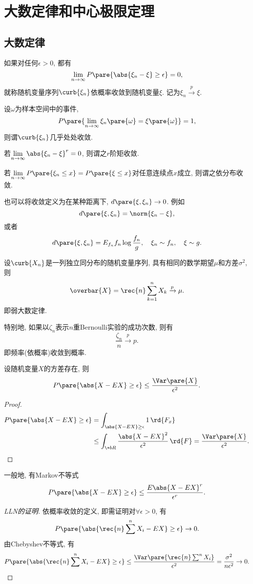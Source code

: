 \documentclass[../Statistics.tex]{subfiles}
\begin{document}
\section{大数定律和中心极限定理} %
\label{sec:大数定律和中心极限定理}

\subsection{大数定律} %
\label{sub:大数定律}

如果对任何$\epsilon>0$, 都有
\[ \lim_{n\rightarrow \infty} P\pare{\abs{\xi_n - \xi}\ge \epsilon} = 0, \]
就称随机变量序列$\curb{\xi_n}$依概率收敛到随机变量$\xi$. 记为$\xi_n\xrightarrow{p} \xi$.
\par
设$\omega$为样本空间中的事件,
\[ P\pare{\lim_{n\rightarrow\infty}\xi_n\pare{\omega} = \xi\pare{\omega}} = 1, \]
则谓$\curb{\xi_n}$几乎处处收敛.
\par
若$\displaystyle \lim_{n\rightarrow\infty} \abs{\xi_n - \xi}^r = 0$, 则谓之$r$阶矩收敛.
\par
若$\displaystyle \lim_{n\rightarrow\infty} P\pare{\xi_n \le x} = P\pare{\xi \le x}$对任意连续点$x$成立, 则谓之依分布收敛.
\par
也可以将收敛定义为在某种距离下, $d\pare{\xi, \xi_n}\rightarrow 0$. 例如
\[ d\pare{\xi, \xi_n} = \norm{\xi_n - \xi}, \]
或者
\[ d\pare{\xi, \xi_n} = E_{f_n}f_n\log \frac{f_n}{g}, \quad \xi_n \sim f_n,\quad \xi\sim g. \]
\begin{theorem}
    设$\curb{X_n}$是一列独立同分布的随机变量序列, 具有相同的数学期望$\mu$和方差$\sigma^2$, 则
    \[ \overbar{X} = \rec{n} \sum_{k=1}^n X_k \xrightarrow{p} \mu. \]
    即弱大数定律.
\end{theorem}
特别地, 如果以$\zeta_n$表示$n$重Bernoulli实验的成功次数, 则有
\[ \frac{\zeta_n}{n} \xrightarrow{p} p. \]
即频率(依概率)收敛到概率.
\begin{lemma}[Chebyshev不等式]
    设随机变量$X$的方差存在, 则
    \[ P\pare{\abs{X-EX} \ge \epsilon} \le \frac{\Var\pare{X}}{\epsilon^2}. \]
\end{lemma}
\begin{proof}
    \begin{align*}
        P\pare{\abs{X-EX}\ge \epsilon} &= \int_{\abs{X-EX}\ge\epsilon} 1\,\rd{F_x} \\
        & \le \int_{\+bR} \frac{\abs{X-EX}^2}{\epsilon^2}\,\rd{F} = \frac{\Var\pare{X}}{\epsilon^2}. \qedhere
    \end{align*}
\end{proof}
\begin{remark}
    一般地, 有Markov不等式
    \[ P\pare{\abs{X-EX}\ge \epsilon} \le \frac{E\abs{X-EX}^r}{\epsilon^r}. \]
\end{remark}
\begin{proof}[LLN的证明]
    依概率收敛的定义, 即需证明对$\forall \epsilon>0$, 有
    \[ P\pare{\abs{\rec{n} \sum^n X_i - EX}\ge \epsilon}\rightarrow 0. \]
    由Chebyshev不等式, 有
    \[ P\pare{\abs{\rec{n}\sum^n X_i - EX}\ge\epsilon} \le \frac{\Var\pare{\rec{n}\sum^n X_i}}{\epsilon^2} = \frac{\sigma^2}{n\epsilon^2}\rightarrow 0. \qedhere \]
\end{proof}
\end{document}
